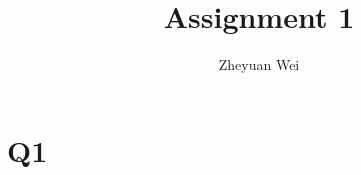 \documentclass{article}
\begin{document}
\title{Assignment 1}

\author{Zheyuan Wei}

\maketitle

\section{Q1}

\end{document}
